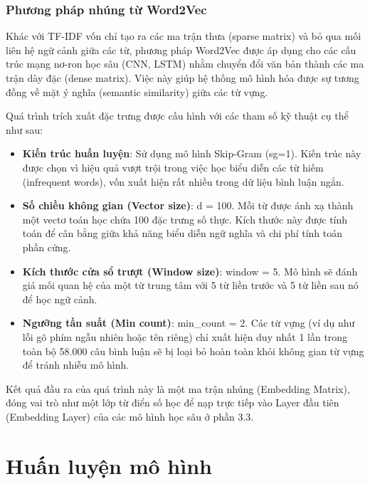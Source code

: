 \subsubsection{Phương pháp nhúng từ Word2Vec}

Khác với TF-IDF vốn chỉ tạo ra các ma trận thưa (sparse matrix) và bỏ qua mối liên hệ ngữ cảnh giữa các từ, phương pháp Word2Vec được áp dụng cho các cấu trúc mạng nơ-ron học sâu (CNN, LSTM) nhằm chuyển đổi văn bản thành các ma trận dày đặc (dense matrix). Việc này giúp hệ thống mô hình hóa được sự tương đồng về mặt ý nghĩa (semantic similarity) giữa các từ vựng.

Quá trình trích xuất đặc trưng được cấu hình với các tham số kỹ thuật cụ thể như sau:
\begin{itemize}
	\item \textbf{Kiến trúc huấn luyện}: Sử dụng mô hình Skip-Gram (sg=1). Kiến trúc này được chọn vì hiệu quả vượt trội trong việc học biểu diễn các từ hiếm (infrequent words), vốn xuất hiện rất nhiều trong dữ liệu bình luận ngắn.
	
	\item \textbf{Số chiều không gian (Vector size)}: d = 100. Mỗi từ được ánh xạ thành một vectơ toán học chứa 100 đặc trưng số thực. Kích thước này được tính toán để cân bằng giữa khả năng biểu diễn ngữ nghĩa và chi phí tính toán phần cứng.
	
	\item \textbf{Kích thước cửa sổ trượt (Window size)}: window = 5. Mô hình sẽ đánh giá mối quan hệ của một từ trung tâm với 5 từ liền trước và 5 từ liền sau nó để học ngữ cảnh.
	
	\item \textbf{Ngưỡng tần suất (Min count)}: min\_count = 2. Các từ vựng (ví dụ như lỗi gõ phím ngẫu nhiên hoặc tên riêng) chỉ xuất hiện duy nhất 1 lần trong toàn bộ 58.000 câu bình luận sẽ bị loại bỏ hoàn toàn khỏi không gian từ vựng để tránh nhiễu mô hình.
\end{itemize}

Kết quả đầu ra của quá trình này là một ma trận nhúng (Embedding Matrix), đóng vai trò như một lớp từ điển số học để nạp trực tiếp vào Layer đầu tiên (Embedding Layer) của các mô hình học sâu ở phần 3.3.

\section{Huấn luyện mô hình}

